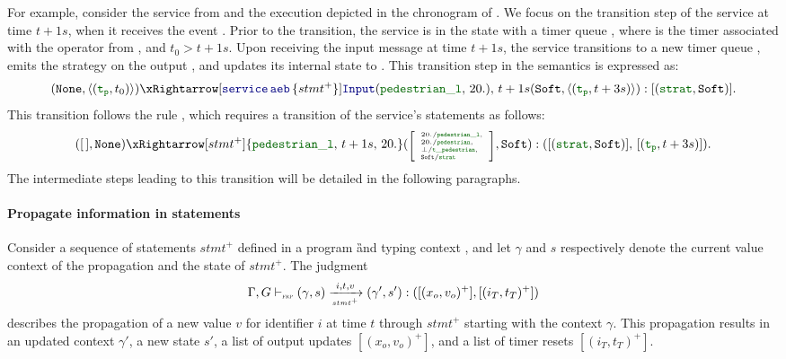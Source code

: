 For example, consider the  service from  and the execution
depicted in the chronogram of . We focus on the
transition step of the service at time $t + 1s$, when it receives the event .
%
Prior to the transition, the service is in the state \No with a timer queue
, where  is the timer associated with the  operator
from , and $t_0 > t + 1s$.
%
Upon receiving the input message  at time $t + 1s$, the service
transitions to a new timer queue , emits the strategy \Soft on the output
, and updates its internal state to \Soft.
%
This transition step in the semantics is expressed as:
\begin{equation*}
    (\No, \queue{(\idf{t_p},t_0)})
    \xRightarrow[\service{\kwf{aeb}}{stmt^+}]{\inputMess{\idf{pedestrian\_l}}{20.}, \, t+1s}
    (\Soft, \queue{(\idf{t_p},t+3s)}): [(\idf{strat}, \Soft)].
\end{equation*}
%
This transition follows the rule , which
requires a transition of the service's statements as follows:
\begin{equation*}
    (\emptygamma, \No)
    \xRightarrow[stmt^+]{\idf{pedestrian\_l}, \, t+1s, \, 20.}
    (\mathtiny{\left[\begin{array}{l}
                20./\idf{pedestrian\_l},  \\
                20./\idf{pedestrian},     \\
                \bot/\idf{t\_pedestrian}, \\
                \Soft/\idf{strat}
            \end{array}\right]}, \Soft):
    ([(\idf{strat}, \Soft)], \, [(\idf{t_p}, t+3s)]).
\end{equation*}
%
The intermediate steps leading to this transition will be detailed in the following paragraphs.

\paragraph{Propagate information in statements}

Consider a sequence of statements $stmt^+$ defined in a program \G and typing context \tyCtx, and
let $\gamma$ and $s$ respectively denote the current value context of the propagation and the state
of $stmt^+$. The judgment
\begin{equation*}
    \Gamma, G \vdash_{\textnormal{\tiny\textsc{frp}}} (\gamma, s) \xrightarrow[\mbox{\tiny\ensuremath{stmt^+}}]{i, t, v} (\gamma', s'): ([(x_o, v_o)^+], [(i_T, t_T)^+])
\end{equation*}
describes the propagation of a new value $v$ for identifier $i$ at time $t$ through
$stmt^+$ starting with the context $\gamma$. This propagation results in an updated context
$\gamma'$, a new state $s'$, a list of output updates $[(x_o, v_o)^+]$, and a list of timer resets
$[(i_T, t_T)^+]$.

